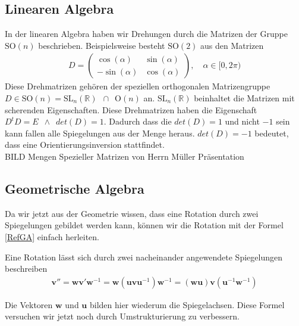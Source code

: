 \subsection{Linearen Algebra}
In der linearen Algebra haben wir Drehungen durch die Matrizen der Gruppe $\text{SO}(n)$ beschrieben. Beispielsweise besteht $\text{SO}(2)$  aus den Matrizen
\begin{align}
	D = 
	\begin{pmatrix}
		\cos(\alpha) & \sin(\alpha) \\
		-\sin(\alpha) & \cos(\alpha) 
	\end{pmatrix},\quad
	\alpha \in [0, 2\pi)
\end{align}
Diese Drehmatrizen gehören der speziellen orthogonalen Matrizengruppe $D\in \text{SO}(n) = \text{SL}_n(\mathbb{R})\enspace \cap \enspace \text{O}(n)$ an. $\text{SL}_n(\mathbb{R})$ beinhaltet die Matrizen mit scherenden Eigenschaften. Diese Drehmatrizen haben die Eigenschaft $D^t D = E \enspace \land \enspace det(D)=1$. Dadurch dass die $det(D) = 1$ und nicht $-1$ sein kann fallen alle Spiegelungen aus der Menge heraus. $det(D) = -1$ bedeutet, dass eine Orientierungsinversion stattfindet.  
\\BILD Mengen Spezieller Matrizen von Herrn Müller Präsentation

\subsection{Geometrische Algebra}
Da wir jetzt aus der Geometrie wissen, dass eine Rotation durch zwei Spiegelungen gebildet werden kann, können wir die Rotation mit der Formel \eqref{RefGA} einfach herleiten.
\begin{satz}
	Eine Rotation lässt sich durch zwei nacheinander angewendete Spiegelungen beschreiben
	\begin{align} \label{rotGA}
		\mathbf{v}'' = \mathbf{wv}'\mathbf{w}^{-1} = \mathbf{w}(\mathbf{uvu}^{-1})\mathbf{w}^{-1} = (\mathbf{wu})\mathbf{v}(\mathbf{u}^{-1}\mathbf{w}^{-1})
	\end{align}
\end{satz}
Die Vektoren $\mathbf{w}$ und $\mathbf{u}$ bilden hier wiederum die Spiegelachsen. Diese Formel versuchen wir jetzt noch durch Umstrukturierung zu verbessern. 
